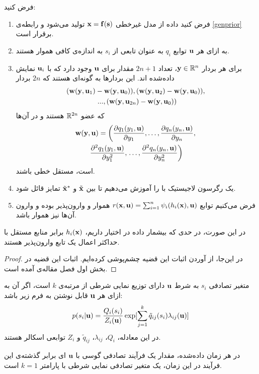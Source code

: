 \begin{theorem}
	فرض کنید:
\begin{enumerate}
	\item 
فرض کنید داده از مدل غیرخطی
$\mathbf{x} = \mathbf{f}(\mathbf{s})$
تولید می‌شود و رابطه‌ی 
\eqref{genprior}
برقرار است.
\item
به ازای هر 
$\mathbf{u}$
توابع 
$q_i$
به عنوان تابعی از 
$s_i$
به اندازه‌ی کافی هموار هستند.
\item
برای هر بردار 
$\mathbf{y} \in \mathbb{R}^n$،
تعداد 
$2n+1$
مقدار برای 
$\mathbf{u}$
وجود دارد که با 
$\mathbf{u}_i$
 نمایش داده‌شده اند. این بردار‌ها به گونه‌ای هستند که
 $2n$
 بردار
 \begin{multline}
 \left(\mathbf{w}(\mathbf{y},\mathbf{u}_1)-\mathbf{w}(\mathbf{y},\mathbf{u}_0)),(\mathbf{w}(\mathbf{y},\mathbf{u}_2)-\mathbf{w}(\mathbf{y},\mathbf{u}_0)),\right. \\ \left. ...,(\mathbf{w}(\mathbf{y},\mathbf{u}_{2n})-\mathbf{w}(\mathbf{y},\mathbf{u}_0)\right)
 \end{multline}
که عضو
 $\mathbb{R}^{2n}$
 هستند و در آن‌ها 
 \begin{multline} \label{wdef}
 \mathbf{w}(\mathbf{y},\mathbf{u})=\left(\frac{\partial q_1(y_1,\mathbf{u})}{ \partial y_1},\ldots,\frac{\partial q_n(y_n,\mathbf{u})}{ \partial y_n},  \right. \\ \frac{\partial^2 q_1(y_1,\mathbf{u})}{ \partial y_1^2},   \left. \ldots,\frac{\partial^2 q_n(y_n,\mathbf{u})}{ \partial y_n^2}\right)
 \end{multline}
 است، مستقل خطی باشند.
\item 
یک رگرسون لاجیستیک
با  
را آموزش می‌دهیم تا بین 
$\tilde{\mathbf{x}}$
و
$\tilde{\mathbf{x}}^*$
تمایز قائل شود.
\item
فرض می‌کنیم توابع 
$
r(\mathbf{x},\mathbf{u})= \sum_{i=1}^n \psi_i(h_i(\mathbf{x}),\mathbf{u})
$
هموار و وارون‌پذیر بوده و وارون آن‌ها نیز هموار باشد.
\end{enumerate}
در این صورت، در حدی که بیشمار داده در اختیار داریم، 
 $h_i(\mathbf{x})$
برابر منابع مستقل با حداکثر اعمال یک تابع  وارون‌پذیر هستند.
\label{newthm}
\end{theorem}
\begin{proof}
در این‌جا، از آوردن اثبات این قضیه چشم‌پوشی کرده‌ایم. اثبات این قضیه در بخش اول فصل
مقاله‌ی 
\cite{newHyva}
آمده است.
\end{proof}

\begin{definition}
متغیر تصادفی 
$s_i$
به شرط 
$\mathbf{u}$
دارای توزیع نمایی شرطی از مرتبه‌ی 
$k$
است، اگر 
آن به ازای هر 
$\mathbf{u}$
 قابل نوشتن به فرم زیر باشد:
\begin{equation} \label{expdef}
p(s_i|\mathbf{u})=\frac{Q_i(s_i)}{Z_i(\mathbf{u})}\exp[\sum_{j=1}^k \tilde{q}_{ij}(s_i)\lambda_{ij}(\mathbf{u})]
\end{equation}
در این معادله،
$Q_i$،
$\lambda_{ij}$،
$\tilde{q}_{ij}$
و 
$Z_i$
توابعی اسکالر هستند.
\end{definition}
\begin{example}
در هر زمان داده‌شده، مقدار یک فرآیند تصادفی گوسی با 
$\mathbf{u}$
ای برابر گذشته‌ی این فرآیند در این زمان، یک متغیر تصادفی نمایی شرطی با پارامتر 
$k = 1$
است.
\end{example}

